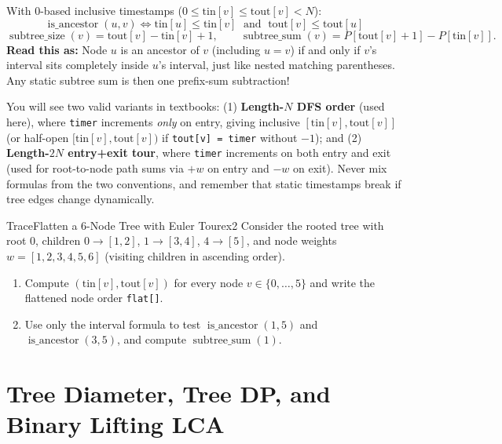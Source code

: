 \documentclass[11pt,a4paper]{article}
\theoremstyle{definition}
\begin{document}
\begin{formulabox}
With $0$-based inclusive timestamps ($0 \le \text{tin}[v] \le \text{tout}[v] < N$):
$$\operatorname{is\_ancestor}(u, v) \iff \text{tin}[u] \le \text{tin}[v] \;\text{ and }\; \text{tout}[v] \le \text{tout}[u]$$
$$\operatorname{subtree\_size}(v) = \text{tout}[v] - \text{tin}[v] + 1, \qquad \operatorname{subtree\_sum}(v) = P[\text{tout}[v] + 1] - P[\text{tin}[v]].$$
\textbf{Read this as:} Node $u$ is an ancestor of $v$ (including $u = v$) if and only if $v$'s interval sits completely inside $u$'s interval, just like nested matching parentheses. Any static subtree sum is then one prefix-sum subtraction!
\end{formulabox}

\begin{watchoutbox}
You will see two valid variants in textbooks: (1) \textbf{Length-$N$ DFS order} (used here), where \texttt{timer} increments \emph{only} on entry, giving inclusive $[\text{tin}[v], \text{tout}[v]]$ (or half-open $[\text{tin}[v], \text{tout}[v])$ if \texttt{tout[v] = timer} without $-1$); and (2) \textbf{Length-$2N$ entry+exit tour}, where \texttt{timer} increments on both entry and exit (used for root-to-node path sums via $+w$ on entry and $-w$ on exit). Never mix formulas from the two conventions, and remember that static timestamps break if tree edges change dynamically.
\end{watchoutbox}

\begin{tryitbox}{Trace}{Flatten a 6-Node Tree with Euler Tour}{ex2}
Consider the rooted tree with root $0$, children $0 \to [1, 2]$, $1 \to [3, 4]$, $4 \to [5]$, and node weights $w = [1, 2, 3, 4, 5, 6]$ (visiting children in ascending order).
\begin{enumerate}[itemsep=2pt, topsep=2pt]
    \item Compute $(\text{tin}[v], \text{tout}[v])$ for every node $v \in \{0, \dots, 5\}$ and write the flattened node order \texttt{flat[]}.
    \item Use only the interval formula to test $\operatorname{is\_ancestor}(1, 5)$ and $\operatorname{is\_ancestor}(3, 5)$, and compute $\operatorname{subtree\_sum}(1)$.
\end{enumerate}
\end{tryitbox}

\section{Tree Diameter, Tree DP, and Binary Lifting LCA}
\label{sec:diameter_lca}
\end{document}
